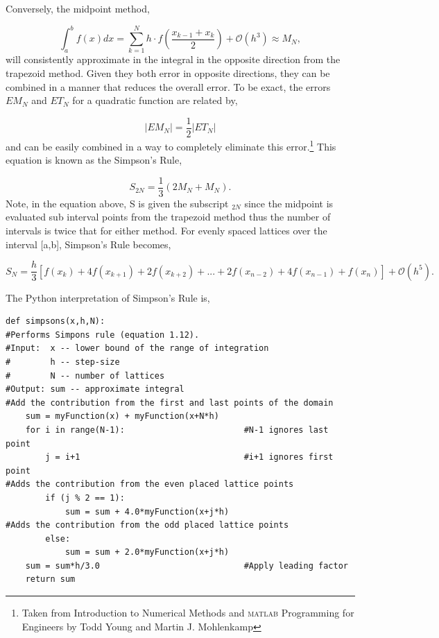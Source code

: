 \documentclass[10pt]{article}
\begin{document}
Conversely, the midpoint method,

\begin{equation}
	\label{eq:midpoint}
	\int^b_a f(x)dx = \sum^N_{k=1} h\cdot f\left(\frac{x_{k-1}+x_k}{2}\right) + \mathcal{O}(h^3) \approx M_N,
\end{equation}
will consistently approximate in the integral in the opposite direction from the trapezoid method. Given they both error in opposite directions, they can be combined in a manner that reduces the overall error. To be exact, the errors $EM_N$ and $ET_N$ for a quadratic function are related by,

\[
	|EM_N| = \frac{1}{2}|ET_N|
\]
and can be easily combined in a way to completely eliminate this error.\footnote{Taken from Introduction to Numerical Methods and \textsc{matlab} Programming for Engineers by Todd Young and Martin J. Mohlenkamp} This equation is known as the Simpson's Rule, 

\[
	S_{2N} = \frac{1}{3}(2M_N + M_N).
\]
Note, in the equation above, S is given the subscript $_{2N}$ since the midpoint is evaluated sub interval points from the trapezoid method thus the number of intervals is twice that for either method. For evenly spaced lattices over the interval [a,b], Simpson's Rule becomes,

\begin{equation}
	\label{eq:simpson}
	S_N = \frac{h}{3}[f(x_k)+4f(x_{k+1})+2f(x_{k+2})+...+2f(x_{n-2})+4f(x_{n-1})+f(x_n)] + \mathcal{O}(h^5).
\end{equation}

The Python interpretation of Simpson's Rule is,
\begin{lstlisting}   
def simpsons(x,h,N):
#Performs Simpons rule (equation 1.12).
#Input:  x -- lower bound of the range of integration
#        h -- step-size
#        N -- number of lattices
#Output: sum -- approximate integral
#Add the contribution from the first and last points of the domain
    sum = myFunction(x) + myFunction(x+N*h)
    for i in range(N-1):						#N-1 ignores last point
        j = i+1        						    #i+1 ignores first point
#Adds the contribution from the even placed lattice points        
        if (j % 2 == 1):
            sum = sum + 4.0*myFunction(x+j*h)
#Adds the contribution from the odd placed lattice points            
        else:
            sum = sum + 2.0*myFunction(x+j*h)                    
    sum = sum*h/3.0                             #Apply leading factor
    return sum
\end{lstlisting}
\end{document}
